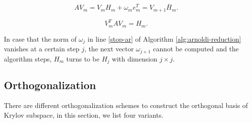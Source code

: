 \begin{equation}
AV_m = V_m H_m + \omega_me_m^T = V_{m+1}\bar{H}_m.
\end{equation}

\begin{equation}
V_m^T A V_m = H_m.
\end{equation}

In case that the norm of $\omega_j$ in line \ref{stop-ar} of  Algorithm \ref{alg:arnoldi-reduction} vanishes at a certain step $j$, the next vector $\omega_{j+1}$ cannot be computed and the algorithm steps, $H_m$ turns to be $H_j$ with dimension $j \times j$.


\subsection{Orthogonalization}

There are different orthogonalization schemes to construct the orthogonal basis of Krylov subspace, in this section, we list four variants.

